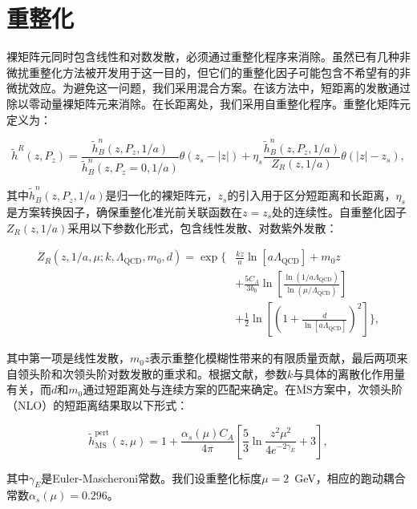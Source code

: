 \documentclass[12pt,a4paper]{ctexart}
\begin{document}
\section{重整化}

裸矩阵元同时包含线性和对数发散，必须通过重整化程序来消除。虽然已有几种非微扰重整化方法被开发用于这一目的\cite{Chen2017,Izubuchi2018,Alexandrou2017,Radyushkin2018,Braun2019,Li2019}，但它们的重整化因子可能包含不希望有的非微扰效应。为避免这一问题，我们采用混合方案\cite{Ji2021}。在该方法中，短距离的发散通过除以零动量裸矩阵元来消除。在长距离处，我们采用自重整化程序。重整化矩阵元定义为：

\begin{equation}
\tilde{h}^R(z, P_z) = \frac{\tilde{h}^n_B(z, P_z, 1/a)}{\tilde{h}^n_B(z, P_z=0, 1/a)} \theta(z_s - |z|) + \eta_s \frac{\tilde{h}^n_B(z, P_z, 1/a)}{Z_R(z, 1/a)} \theta(|z| - z_s),
\label{eq:hybrid}
\end{equation}

其中$\tilde{h}^n_B(z, P_z, 1/a)$是归一化的裸矩阵元，$z_s$的引入用于区分短距离和长距离，$\eta_s$是方案转换因子，确保重整化准光前关联函数在$z = z_s$处的连续性。自重整化因子$Z_R(z, 1/a)$采用以下参数化形式，包含线性发散、对数紫外发散：

\begin{equation}
\begin{aligned}
Z_R(z, 1/a, \mu; k, \Lambda_{\text{QCD}}, m_0, d) = \exp\Bigg\{&\frac{kz}{a}\ln[a\Lambda_{\text{QCD}}] + m_0 z \\
&+ \frac{5C_A}{3b_0} \ln\left[\frac{\ln(1/a\Lambda_{\text{QCD}})}{\ln(\mu/\Lambda_{\text{QCD}})}\right] \\
&+ \frac{1}{2}\ln\left[\left(1 + \frac{d}{\ln[a\Lambda_{\text{QCD}}]}\right)^2\right]\Bigg\},
\end{aligned}
\label{eq:ZR}
\end{equation}

其中第一项是线性发散，$m_0 z$表示重整化模糊性带来的有限质量贡献，最后两项来自领头阶和次领头阶对数发散的重求和。根据文献\cite{LP3-2021}，参数$k$与具体的离散化作用量有关，而$d$和$m_0$通过短距离处与连续方案的匹配来确定。在$\overline{\text{MS}}$方案中，次领头阶（NLO）的短距离结果取以下形式：

\begin{equation}
\tilde{h}^{\text{pert}}_{\overline{\text{MS}}}(z, \mu) = 1 + \frac{\alpha_s(\mu)C_A}{4\pi}\left[\frac{5}{3}\ln\frac{z^2\mu^2}{4e^{-2\gamma_E}} + 3\right],
\label{eq:MSbar}
\end{equation}

其中$\gamma_E$是Euler-Mascheroni常数。我们设重整化标度$\mu = 2$~GeV，相应的跑动耦合常数$\alpha_s(\mu) = 0.296$。
\end{document}
